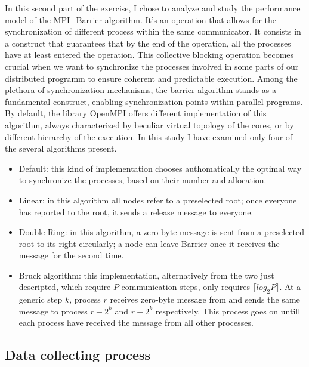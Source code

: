 \documentclass{article}
\begin{document}
	In this second part of the exercise, I chose to analyze and study the performance model of the MPI\_Barrier algorithm. It's an operation that allows for the synchronization of different process within the same communicator. It consists in a construct that guarantees that by the end of the operation, all the processes have at least entered the operation.
	This collective blocking operation becomes crucial when we want to synchronize the processes involved in some parts of our distributed programm to ensure coherent and predictable execution. Among the plethora of synchronization mechanisms, the barrier algorithm stands as a fundamental construct, enabling synchronization points within parallel programs.
	By default, the library OpenMPI offers different implementation of this algorithm, always characterized by beculiar virtual topology of the cores, or by different hierarchy of the execution. In this study I have examined only four of the  several algorithms present.
	
	\begin{itemize}
		\item Default: this kind of implementation chooses authomatically the optimal way to synchronize the processes, based on their number and allocation.\\
		\item Linear: in this algorithm all nodes refer to a preselected root; once everyone has reported to the root, it sends a release message to everyone.\\
		\item Double Ring: in this algorithm, a zero-byte message is sent from a preselected root to its right circularly; a node can leave Barrier once it receives the message for the second time.\\
		\item Bruck algorithm: this implementation, alternatively from the two just descripted, which require $P$ communication steps, only requires $\lceil log_2P \rceil$. At a generic step $k$, process $r$ receives zero-byte message from and sends the same message to process $r - 2^k$ and $r + 2^k$ respectively. This process goes on untill each process have received the message from all other processes.
	\end{itemize}
	
	\subsection{Data collecting process}
	
\end{document}
